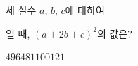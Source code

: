 세 실수 $a$, $b$, $c$에 대하여\par\smallskip{}\par\smallskip\noindent 일 때, $(a+2b+c)^2$의 값은?
\begin{choices32}{$49$}{$64$}{$81$}{$100$}{$121$}\end{choices32}
